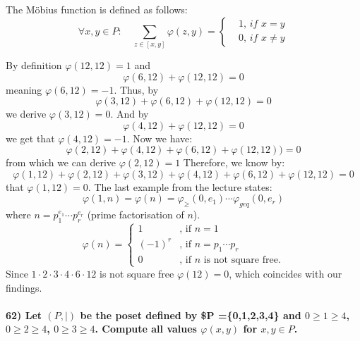 \documentclass[
]{article}
\begin{document}
The Möbius function is defined as follows: \[
\forall x,y \in P: \quad \sum_{z \in [x,y]} \varphi(z,y) = 
    \begin{cases}
    &1 \textit{, if } x=y \\
    &0 \textit{, if } x \neq y
    \end{cases}
\]

By definition \(\varphi(12,12) = 1\) and \[
\varphi(6,12) + \varphi(12,12) = 0
\] meaning \(\varphi(6,12) = -1\). Thus, by \[
\varphi(3,12) + \varphi(6,12) + \varphi(12,12) = 0
\] we derive \(\varphi(3,12) = 0\). And by \[
\varphi(4,12) +  \varphi(12,12) = 0
\] we get that \(\varphi(4,12) = -1\). Now we have: \[
\varphi(2,12) +  \varphi(4,12) + \varphi(6,12) +  \varphi(12,12) ) = 0
\] from which we can derive \(\varphi(2,12) = 1\) Therefore, we know by:
\[
 \varphi(1,12) +  \varphi(2,12) + \varphi(3,12) +  \varphi(4,12) +  \varphi(6,12) +  \varphi(12,12) = 0
\] that \(\varphi(1,12) = 0\). The last example from the lecture states:
\[
\varphi(1,n) = \varphi(n)= \varphi_{\geq}(0,e_1) \cdots \varphi_{geq}(0,e_r)
\] where \(n = p_1^{e_1} \cdots p_r^{e_r}\) (prime factorisation of
\(n\)). \[
\varphi(n)=
    \begin{cases} 
        1 &\text{, if } n=1\\
        (-1)^r &\text{, if } n=p_1 \cdots p_r\\
        0 &\text{, if $n$ is not square free}.
    \end{cases}
\] Since \(1 \cdot 2 \cdot 3 \cdot 4 \cdot 6 \cdot 12\) is not square
free \(\varphi(12)=0\), which coincides with our findings.

\hypertarget{let-p-be-the-poset-defined-by-p-01234-and-0-geq-1-geq-4-0-geq-2-geq-4-0-geq-3-geq-4.-compute-all-values-varphixy-for-xy-in-p.}{%
\paragraph{\texorpdfstring{62) Let \((P,|)\) be the poset defined by \$P
=\{0,1,2,3,4\} and \(0 \geq 1 \geq 4\), \(0 \geq 2 \geq 4\),
\(0 \geq 3 \geq 4\). Compute all values \(\varphi(x,y)\) for
\(x,y \in P\).}{62) Let (P,\textbar) be the poset defined by \$P =\{0,1,2,3,4\} and 0 \textbackslash geq 1 \textbackslash geq 4, 0 \textbackslash geq 2 \textbackslash geq 4, 0 \textbackslash geq 3 \textbackslash geq 4. Compute all values \textbackslash varphi(x,y) for x,y \textbackslash in P.}}\label{let-p-be-the-poset-defined-by-p-01234-and-0-geq-1-geq-4-0-geq-2-geq-4-0-geq-3-geq-4.-compute-all-values-varphixy-for-xy-in-p.}}
\end{document}
